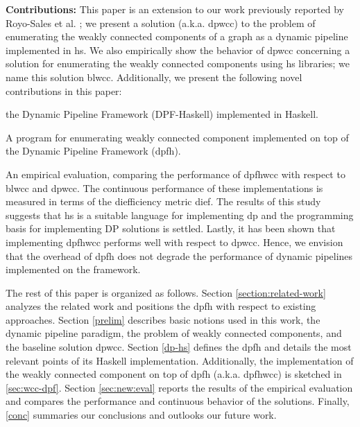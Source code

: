 \textbf{Contributions:} 
This paper is an extension to our work previously reported by Royo-Sales et al. \cite{prole}; we present a solution (a.k.a. \acrshort{dpwcc}) to the problem of enumerating the weakly connected components of a graph as a dynamic pipeline implemented in \acrshort{hs}. We also empirically show the behavior of \acrshort{dpwcc} concerning a solution for enumerating the weakly connected components using \acrshort{hs} libraries; we name this solution \acrfull{blwcc}. 
Additionally,  we present the following novel contributions in this paper:
\begin{inparaenum}[i\upshape)]
\item the Dynamic Pipeline Framework (DPF-Haskell) implemented in Haskell. 
\item A program for enumerating weakly connected component implemented on top of the Dynamic Pipeline Framework (\acrshort{dpfh}).
\item An empirical evaluation, comparing the performance of 
\acrfull{dpfhwcc} with respect to \acrshort{blwcc} and \acrfull{dpwcc}. 
The continuous  performance of these im\-ple\-men\-ta\-tions is measured in terms of the diefficiency metric dief\@t \cite{diefpaper}. The results of this study suggests that  \acrshort{hs} is a suitable language for implementing \acrshort{dp} and the programming basis for implementing DP solutions is settled. Lastly, it has been shown that implementing \acrshort{dpfhwcc} performs well with respect to \acrshort{dpwcc}. 
Hence, we envision that the overhead of \acrshort{dpfh} does not degrade the performance of dynamic pipelines implemented on the framework. 
\end{inparaenum}

The rest of this paper is organized as follows. 
Section \ref{section:related-work} analyzes the related work and positions the \acrlong{dpfh} with respect to existing approaches. Section \ref{prelim} describes basic notions used in this work, the dynamic pipeline paradigm, the problem of weakly connected components, and the baseline solution  \acrshort{dpwcc}.  
Section \ref{dp-hs}  defines the \acrlong{dpfh} 
and details the most relevant points of its Haskell implementation. Additionally, the implementation of the weakly connected component on top of  \acrlong{dpfh} (a.k.a. \acrfull{dpfhwcc}) is sketched in \autoref{sec:wcc-dpf}. Section \ref{sec:new:eval} reports the results of the empirical evaluation and compares the performance and continuous behavior of the solutions. Finally, \autoref{conc} summaries our conclusions and outlooks our future work. 
